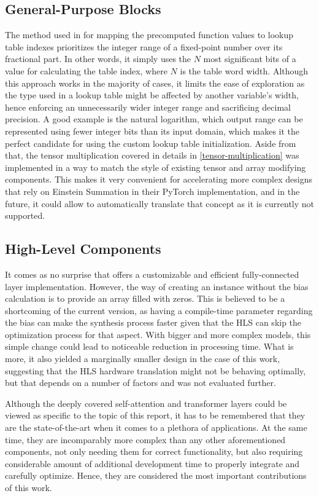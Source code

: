 \subsection{General-Purpose Blocks}\label{hls4ml-general-purpose}
The method used in \hlsml for mapping the precomputed function values to lookup table indexes prioritizes the integer range of a fixed-point number over its fractional part. In other words, it simply uses the \(N\) most significant bits of a value for calculating the table index, where \(N\) is the table word width. Although this approach works in the majority of cases, it limits the ease of exploration as the type used in a lookup table might be affected by another variable's width, hence enforcing an unnecessarily wider integer range and sacrificing decimal precision. A good example is the natural logarithm, which output range can be represented using fewer integer bits than its input domain, which makes it the perfect candidate for using the custom lookup table initialization. Aside from that, the tensor multiplication covered in details in \cref{tensor-multiplication} was implemented in a way to match the style of existing tensor and array modifying components. This makes it very convenient for accelerating more complex designs that rely on Einstein Summation in their PyTorch implementation, and in the future, it could allow \hlsml to automatically translate that concept as it is currently not supported.

\subsection{High-Level Components}
It comes as no surprise that \hlsml offers a customizable and efficient fully-connected layer implementation. However, the way of creating an instance without the bias calculation is to provide an array filled with zeros. This is believed to be a shortcoming of the current version, as having a compile-time parameter regarding the bias can make the synthesis process faster given that the HLS can skip the optimization process for that aspect. With bigger and more complex models, this simple change could lead to noticeable reduction in processing time. What is more, it also yielded a marginally smaller design in the case of this work, suggesting that the HLS hardware translation might not be behaving optimally, but that depends on a number of factors and was not evaluated further.

Although the deeply covered self-attention and transformer layers could be viewed as specific to the topic of this report, it has to be remembered that they are the state-of-the-art when it comes to a plethora of applications. At the same time, they are incomparably more complex than any other aforementioned components, not only needing them for correct functionality, but also requiring considerable amount of additional development time to properly integrate and carefully optimize. Hence, they are considered the most important \hlsml contributions of this work.


